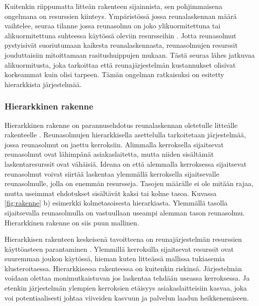Kuitenkin riippumatta litteän rakenteen sijainnista, sen pohjimmaisena ongelmana on resurssien kiinteys. Ympäristössä jossa reunalaskennan määrä vaihtelee, seuraa tilanne jossa reunasolmu on joko ylikuormitettuna tai alikuormitettuna suhteessa käytössä oleviin resursseihin \cite{tong2016hierarchical}. Jotta reunasolmut pystyisivät suoriutumaan kaikesta reunalaskennasta, reunasolmujen resurssit jouduttaisiin mitoittamaan rasitushuippujen mukaan. Tästä seuraa lähes jatkuvaa alikuormitusta, joka tarkoittaa että reunajärjestelmän kustannukset olisivat korkeammat kuin olisi tarpeen. 
Tämän ongelman ratkaisuksi on esitetty hierarkkista järjestelmää.




\subsubsection{Hierarkkinen rakenne}
Hierarkkinen rakenne on parannusehdotus reunalaskennan oletetulle litteälle rakenteelle \cite{tong2016hierarchical}.
Reunasolmujen hierarkkisella asettelulla tarkoitetaan järjestelmää, jossa reunasolmut on jaettu kerroksiin. Alimmalla kerroksella sijaitsevat reunasolmut ovat lähimpänä asiakaslaitetta, mutta niiden sisältämät laskentaresurssit ovat vähäisiä. 
Ideana on että alemmalla kerroksessa sijaitsevat reunasolmut voivat siirtää laskentaa ylemmällä kerroksella sijaitsevalle reunasolmulle, jolla on enemmän resursseja. Tasojen määrälle ei ole mitään rajaa, mutta useimmat ehdotukset sisältävät kaksi tai kolme tasoa. Kuvassa \ref{fig:rakenne} b) esimerkki kolmetasoisesta hierarkiasta.
Ylemmällä tasolla sijaitsevalla reunasolmulla on vastuullaan useampi alemman tason reunasolmu. Hierarkkinen rakenne on siis puun mallinen.

Hierarkkisen rakenteen keskeisenä tavoitteena on reunajärjestelmän resurssien käyttöasteen parantaminen \cite{tong2016hierarchical}. Ylemmillä kerroksilla sijaitsevat resurssit ovat suuremman joukon käytössä, hieman kuten litteässä mallissa tukiasemia klusteroitaessa. 
Hierarkkisessa rakenteessa on kuitenkin riskinsä. Järjestelmän voidaan olettaa monimutkaistuvan jos laskentaa tehdään useassa kerroksessa. Ja etenkin järjestelmän ylempien kerroksien etäisyys asiakaslaitteisiin kasvaa, joka voi potentiaalisesti johtaa viiveiden kasvuun ja palvelun laadun heikkenemiseen.

